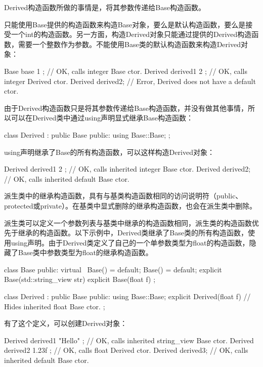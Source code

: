 Derived构造函数所做的事情是，将其参数传递给Base构造函数。

只能使用Base提供的构造函数来构造Base对象，要么是默认构造函数，要么是接受一个int的构造函数。另一方面，构造Derived对象只能通过提供的Derived构造函数，需要一个整数作为参数。不能使用Base类的默认构造函数来构造Derived对象：

\begin{cpp}
Base base { 1 }; // OK, calls integer Base ctor.
Derived derived1 { 2 }; // OK, calls integer Derived ctor.
Derived derived2; // Error, Derived does not have a default ctor.
\end{cpp}

由于Derived构造函数只是将其参数传递给Base构造函数，并没有做其他事情，所以可以在Derived类中通过using声明显式继承Base构造函数：

\begin{cpp}
class Derived : public Base
{
    public:
        using Base::Base;
};
\end{cpp}

using声明继承了Base的所有构造函数，可以这样构造Derived对象：

\begin{cpp}
Derived derived1 { 2 }; // OK, calls inherited integer Base ctor.
Derived derived2; // OK, calls inherited default Base ctor.
\end{cpp}

派生类中的继承构造函数，具有与基类构造函数相同的访问说明符（public、protected或private）。在基类中显式删除的继承构造函数，也会在派生类中删除。


派生类可以定义一个参数列表与基类中继承的构造函数相同，派生类的构造函数优先于继承的构造函数。以下示例中，Derived类继承了Base类的所有构造函数，使用using声明。由于Derived类定义了自己的一个单参数类型为float的构造函数，隐藏了Base类中参数类型为float的继承构造函数。

\begin{cpp}
class Base
{
    public:
        virtual ~Base() = default;
        Base() = default;
        explicit Base(std::string_view str) {}
        explicit Base(float f) {}
};

class Derived : public Base
{
    public:
        using Base::Base;
        explicit Derived(float f) {} // Hides inherited float Base ctor.
};
\end{cpp}

有了这个定义，可以创建Derived对象：

\begin{cpp}
Derived derived1 { "Hello" }; // OK, calls inherited string_view Base ctor.
Derived derived2 { 1.23f }; // OK, calls float Derived ctor.
Derived derived3; // OK, calls inherited default Base ctor.
\end{cpp}

